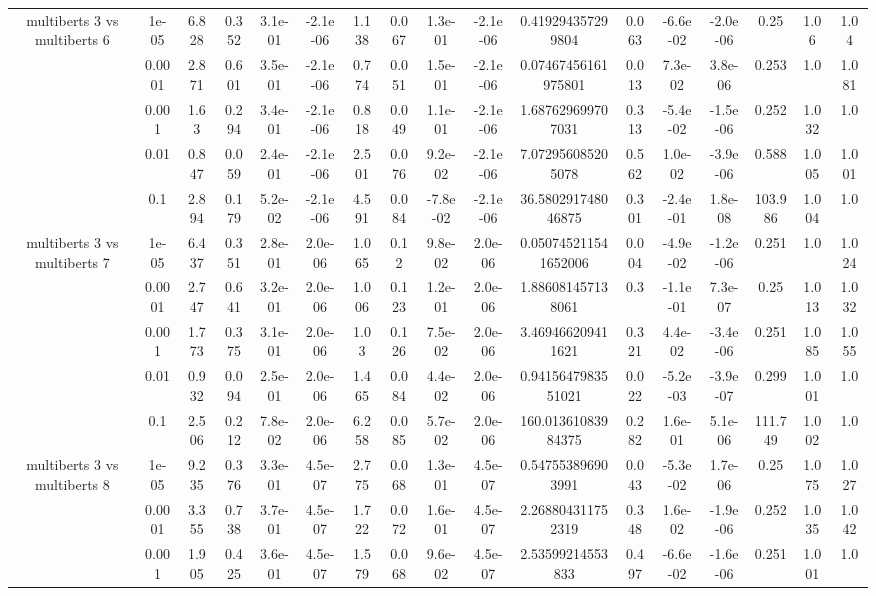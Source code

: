 \begin{tabular}{|c|c|c|c|c|c|c|c|c|c|c|c|c|c|c|c|c|}
\hline
\multirow{5}{*}{multiberts 3 vs multiberts 6} & 1e-05 & 6.828 & 0.352 & 3.1e-01 & -2.1e-06 & 1.138 & 0.067 & 1.3e-01 & -2.1e-06 & 0.419294357299804 & 0.063 & -6.6e-02 & -2.0e-06 & 0.25 & 1.06 & 1.04 \\
 & 0.0001 & 2.871 & 0.601 & 3.5e-01 & -2.1e-06 & 0.774 & 0.051 & 1.5e-01 & -2.1e-06 & 0.07467456161975801 & 0.013 & 7.3e-02 & 3.8e-06 & 0.253 & 1.0 & 1.081 \\
 & 0.001 & 1.63 & 0.294 & 3.4e-01 & -2.1e-06 & 0.818 & 0.049 & 1.1e-01 & -2.1e-06 & 1.687629699707031 & 0.313 & -5.4e-02 & -1.5e-06 & 0.252 & 1.032 & 1.0 \\
 & 0.01 & 0.847 & 0.059 & 2.4e-01 & -2.1e-06 & 2.501 & 0.076 & 9.2e-02 & -2.1e-06 & 7.072956085205078 & 0.562 & 1.0e-02 & -3.9e-06 & 0.588 & 1.005 & 1.001 \\
 & 0.1 & 2.894 & 0.179 & 5.2e-02 & -2.1e-06 & 4.591 & 0.084 & -7.8e-02 & -2.1e-06 & 36.580291748046875 & 0.301 & -2.4e-01 & 1.8e-08 & 103.986 & 1.004 & 1.0 \\
\hline
\multirow{5}{*}{multiberts 3 vs multiberts 7} & 1e-05 & 6.437 & 0.351 & 2.8e-01 & 2.0e-06 & 1.065 & 0.12 & 9.8e-02 & 2.0e-06 & 0.050745211541652006 & 0.004 & -4.9e-02 & -1.2e-06 & 0.251 & 1.0 & 1.024 \\
 & 0.0001 & 2.747 & 0.641 & 3.2e-01 & 2.0e-06 & 1.006 & 0.123 & 1.2e-01 & 2.0e-06 & 1.886081457138061 & 0.3 & -1.1e-01 & 7.3e-07 & 0.25 & 1.013 & 1.032 \\
 & 0.001 & 1.773 & 0.375 & 3.1e-01 & 2.0e-06 & 1.03 & 0.126 & 7.5e-02 & 2.0e-06 & 3.469466209411621 & 0.321 & 4.4e-02 & -3.4e-06 & 0.251 & 1.085 & 1.055 \\
 & 0.01 & 0.932 & 0.094 & 2.5e-01 & 2.0e-06 & 1.465 & 0.084 & 4.4e-02 & 2.0e-06 & 0.9415647983551021 & 0.022 & -5.2e-03 & -3.9e-07 & 0.299 & 1.001 & 1.0 \\
 & 0.1 & 2.506 & 0.212 & 7.8e-02 & 2.0e-06 & 6.258 & 0.085 & 5.7e-02 & 2.0e-06 & 160.01361083984375 & 0.282 & 1.6e-01 & 5.1e-06 & 111.749 & 1.002 & 1.0 \\
\hline
\multirow{5}{*}{multiberts 3 vs multiberts 8} & 1e-05 & 9.235 & 0.376 & 3.3e-01 & 4.5e-07 & 2.775 & 0.068 & 1.3e-01 & 4.5e-07 & 0.547553896903991 & 0.043 & -5.3e-02 & 1.7e-06 & 0.25 & 1.075 & 1.027 \\
 & 0.0001 & 3.355 & 0.738 & 3.7e-01 & 4.5e-07 & 1.722 & 0.072 & 1.6e-01 & 4.5e-07 & 2.268804311752319 & 0.348 & 1.6e-02 & -1.9e-06 & 0.252 & 1.035 & 1.042 \\
 & 0.001 & 1.905 & 0.425 & 3.6e-01 & 4.5e-07 & 1.579 & 0.068 & 9.6e-02 & 4.5e-07 & 2.53599214553833 & 0.497 & -6.6e-02 & -1.6e-06 & 0.251 & 1.001 & 1.0 \\

\end{tabular}
